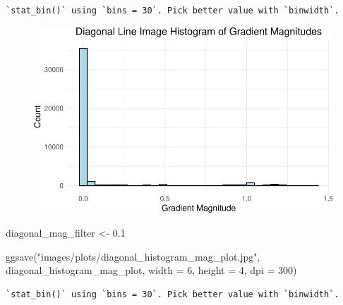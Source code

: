 \documentclass[
  letterpaper,
]{report}
\newenvironment{Shaded}{\begin{snugshade}}{\end{snugshade}}
\newcommand{\AttributeTok}[1]{\textcolor[rgb]{0.40,0.45,0.13}{#1}}
\newcommand{\DecValTok}[1]{\textcolor[rgb]{0.68,0.00,0.00}{#1}}
\newcommand{\FloatTok}[1]{\textcolor[rgb]{0.68,0.00,0.00}{#1}}
\newcommand{\FunctionTok}[1]{\textcolor[rgb]{0.28,0.35,0.67}{#1}}
\newcommand{\NormalTok}[1]{\textcolor[rgb]{0.00,0.23,0.31}{#1}}
\newcommand{\OtherTok}[1]{\textcolor[rgb]{0.00,0.23,0.31}{#1}}
\newcommand{\StringTok}[1]{\textcolor[rgb]{0.13,0.47,0.30}{#1}}
\begin{document}
\begin{verbatim}
`stat_bin()` using `bins = 30`. Pick better value with `binwidth`.
\end{verbatim}

\begin{figure}[H]

{\centering \includegraphics{results_files/figure-pdf/unnamed-chunk-9-5.pdf}

}

\end{figure}

\begin{Shaded}
\begin{Highlighting}[]
\NormalTok{diagonal\_mag\_filter }\OtherTok{\textless{}{-}} \FloatTok{0.1}

\FunctionTok{ggsave}\NormalTok{(}\StringTok{"images/plots/diagonal\_histogram\_mag\_plot.jpg"}\NormalTok{, diagonal\_histogram\_mag\_plot, }\AttributeTok{width =} \DecValTok{6}\NormalTok{, }\AttributeTok{height =} \DecValTok{4}\NormalTok{, }\AttributeTok{dpi =} \DecValTok{300}\NormalTok{)}
\end{Highlighting}
\end{Shaded}

\begin{verbatim}
`stat_bin()` using `bins = 30`. Pick better value with `binwidth`.
\end{verbatim}
\end{document}

